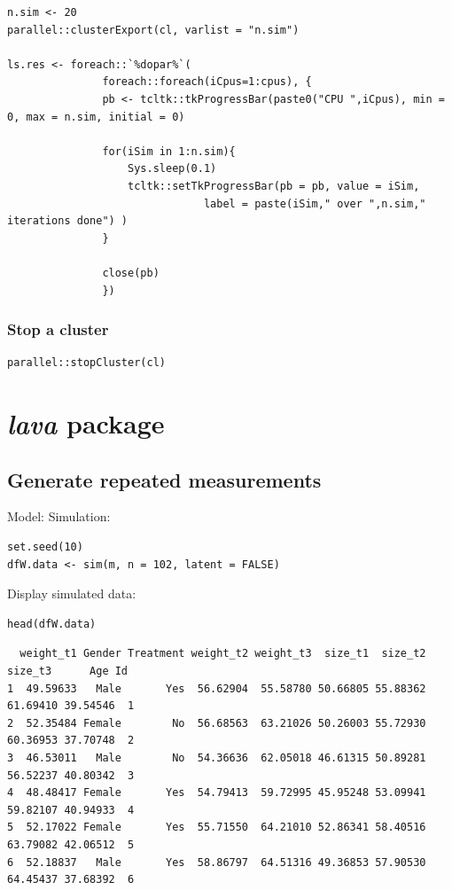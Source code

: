 \documentclass{article}
\begin{document}
\lstset{language=r,label= ,caption= ,captionpos=b,numbers=none}
\begin{lstlisting}
n.sim <- 20
parallel::clusterExport(cl, varlist = "n.sim")

ls.res <- foreach::`%dopar%`(
		       foreach::foreach(iCpus=1:cpus), {
			   pb <- tcltk::tkProgressBar(paste0("CPU ",iCpus), min = 0, max = n.sim, initial = 0)

			   for(iSim in 1:n.sim){
			       Sys.sleep(0.1)
			       tcltk::setTkProgressBar(pb = pb, value = iSim,
						       label = paste(iSim," over ",n.sim," iterations done") )
			   }

			   close(pb)
		       })
\end{lstlisting}

\subsubsection{Stop a cluster}
\label{sec:org43af428}

\lstset{language=r,label= ,caption= ,captionpos=b,numbers=none}
\begin{lstlisting}
parallel::stopCluster(cl)
\end{lstlisting}

\section{\emph{lava} package}
\label{sec:orge97a0b9}
\subsection{Generate repeated measurements}
\label{sec:orgba9f712}
Model:
Simulation:
\lstset{language=r,label= ,caption= ,captionpos=b,numbers=none}
\begin{lstlisting}
set.seed(10)
dfW.data <- sim(m, n = 102, latent = FALSE)
\end{lstlisting}

Display simulated data:
\lstset{language=r,label= ,caption= ,captionpos=b,numbers=none}
\begin{lstlisting}
head(dfW.data)
\end{lstlisting}

\begin{verbatim}
  weight_t1 Gender Treatment weight_t2 weight_t3  size_t1  size_t2  size_t3      Age Id
1  49.59633   Male       Yes  56.62904  55.58780 50.66805 55.88362 61.69410 39.54546  1
2  52.35484 Female        No  56.68563  63.21026 50.26003 55.72930 60.36953 37.70748  2
3  46.53011   Male        No  54.36636  62.05018 46.61315 50.89281 56.52237 40.80342  3
4  48.48417 Female       Yes  54.79413  59.72995 45.95248 53.09941 59.82107 40.94933  4
5  52.17022 Female       Yes  55.71550  64.21010 52.86341 58.40516 63.79082 42.06512  5
6  52.18837   Male       Yes  58.86797  64.51316 49.36853 57.90530 64.45437 37.68392  6
\end{verbatim}
\end{document}
